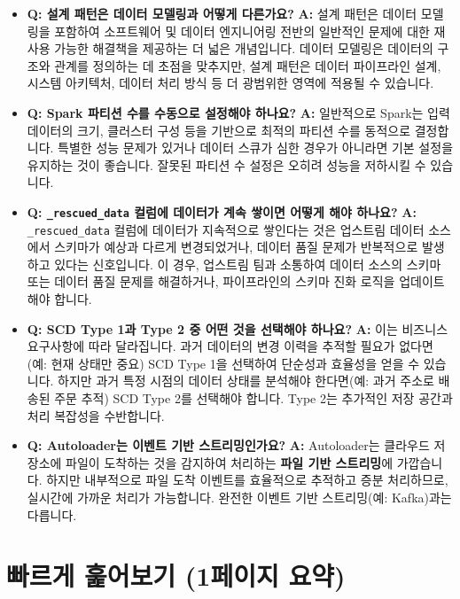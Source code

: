 \documentclass[11pt,a4paper]{article}
\theoremstyle{definition}
\begin{document}
\begin{itemize}
    \item \textbf{Q: 설계 패턴은 데이터 모델링과 어떻게 다른가요?}
    \textbf{A:} 설계 패턴은 데이터 모델링을 포함하여 소프트웨어 및 데이터 엔지니어링 전반의 일반적인 문제에 대한 재사용 가능한 해결책을 제공하는 더 넓은 개념입니다. 데이터 모델링은 데이터의 구조와 관계를 정의하는 데 초점을 맞추지만, 설계 패턴은 데이터 파이프라인 설계, 시스템 아키텍처, 데이터 처리 방식 등 더 광범위한 영역에 적용될 수 있습니다.

    \item \textbf{Q: Spark 파티션 수를 수동으로 설정해야 하나요?}
    \textbf{A:} 일반적으로 Spark는 입력 데이터의 크기, 클러스터 구성 등을 기반으로 최적의 파티션 수를 동적으로 결정합니다. 특별한 성능 문제가 있거나 데이터 스큐가 심한 경우가 아니라면 기본 설정을 유지하는 것이 좋습니다. 잘못된 파티션 수 설정은 오히려 성능을 저하시킬 수 있습니다.

    \item \textbf{Q: \texttt{_rescued_data} 컬럼에 데이터가 계속 쌓이면 어떻게 해야 하나요?}
    \textbf{A:} \texttt{_rescued_data} 컬럼에 데이터가 지속적으로 쌓인다는 것은 업스트림 데이터 소스에서 스키마가 예상과 다르게 변경되었거나, 데이터 품질 문제가 반복적으로 발생하고 있다는 신호입니다. 이 경우, 업스트림 팀과 소통하여 데이터 소스의 스키마 또는 데이터 품질 문제를 해결하거나, 파이프라인의 스키마 진화 로직을 업데이트해야 합니다.

    \item \textbf{Q: SCD Type 1과 Type 2 중 어떤 것을 선택해야 하나요?}
    \textbf{A:} 이는 비즈니스 요구사항에 따라 달라집니다. 과거 데이터의 변경 이력을 추적할 필요가 없다면(예: 현재 상태만 중요) SCD Type 1을 선택하여 단순성과 효율성을 얻을 수 있습니다. 하지만 과거 특정 시점의 데이터 상태를 분석해야 한다면(예: 과거 주소로 배송된 주문 추적) SCD Type 2를 선택해야 합니다. Type 2는 추가적인 저장 공간과 처리 복잡성을 수반합니다.

    \item \textbf{Q: Autoloader는 이벤트 기반 스트리밍인가요?}
    \textbf{A:} Autoloader는 클라우드 저장소에 파일이 도착하는 것을 감지하여 처리하는 \textbf{파일 기반 스트리밍}에 가깝습니다. 하지만 내부적으로 파일 도착 이벤트를 효율적으로 추적하고 증분 처리하므로, 실시간에 가까운 처리가 가능합니다. 완전한 이벤트 기반 스트리밍(예: Kafka)과는 다릅니다.
\end{itemize}

\newpage
\section{빠르게 훑어보기 (1페이지 요약)}
\end{document}
